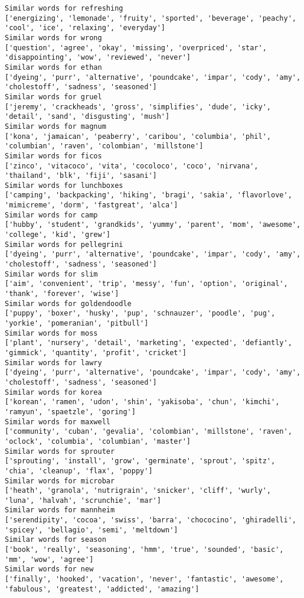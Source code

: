 \documentclass[11pt]{article}
\begin{document}
\begin{Verbatim}[commandchars=\\\{\}]
Similar words for refreshing
['energizing', 'lemonade', 'fruity', 'sported', 'beverage', 'peachy', 'cool', 'ice', 'relaxing', 'everyday']
Similar words for wrong
['question', 'agree', 'okay', 'missing', 'overpriced', 'star', 'disappointing', 'wow', 'reviewed', 'never']
Similar words for ethan
['dyeing', 'purr', 'alternative', 'poundcake', 'impar', 'cody', 'amy', 'cholestoff', 'sadness', 'seasoned']
Similar words for gruel
['jeremy', 'crackheads', 'gross', 'simplifies', 'dude', 'icky', 'detail', 'sand', 'disgusting', 'mush']
Similar words for magnum
['kona', 'jamaican', 'peaberry', 'caribou', 'columbia', 'phil', 'columbian', 'raven', 'colombian', 'millstone']
Similar words for ficos
['zinco', 'vitacoco', 'vita', 'cocoloco', 'coco', 'nirvana', 'thailand', 'blk', 'fiji', 'sasani']
Similar words for lunchboxes
['camping', 'backpacking', 'hiking', 'bragi', 'sakia', 'flavorlove', 'mimicreme', 'dorm', 'fastgreat', 'alca']
Similar words for camp
['hubby', 'student', 'grandkids', 'yummy', 'parent', 'mom', 'awesome', 'college', 'kid', 'grew']
Similar words for pellegrini
['dyeing', 'purr', 'alternative', 'poundcake', 'impar', 'cody', 'amy', 'cholestoff', 'sadness', 'seasoned']
Similar words for slim
['aim', 'convenient', 'trip', 'messy', 'fun', 'option', 'original', 'thank', 'forever', 'wise']
Similar words for goldendoodle
['puppy', 'boxer', 'husky', 'pup', 'schnauzer', 'poodle', 'pug', 'yorkie', 'pomeranian', 'pitbull']
Similar words for moss
['plant', 'nursery', 'detail', 'marketing', 'expected', 'defiantly', 'gimmick', 'quantity', 'profit', 'cricket']
Similar words for lawry
['dyeing', 'purr', 'alternative', 'poundcake', 'impar', 'cody', 'amy', 'cholestoff', 'sadness', 'seasoned']
Similar words for korea
['korean', 'ramen', 'udon', 'shin', 'yakisoba', 'chun', 'kimchi', 'ramyun', 'spaetzle', 'goring']
Similar words for maxwell
['community', 'cuban', 'gevalia', 'colombian', 'millstone', 'raven', 'oclock', 'columbia', 'columbian', 'master']
Similar words for sprouter
['sprouting', 'install', 'grow', 'germinate', 'sprout', 'spitz', 'chia', 'cleanup', 'flax', 'poppy']
Similar words for microbar
['heath', 'granola', 'nutrigrain', 'snicker', 'cliff', 'wurly', 'luna', 'halvah', 'scrunchie', 'mar']
Similar words for mannheim
['serendipity', 'cocoa', 'swiss', 'barra', 'chococino', 'ghiradelli', 'spicey', 'bellagio', 'semi', 'meltdown']
Similar words for season
['book', 'really', 'seasoning', 'hmm', 'true', 'sounded', 'basic', 'mm', 'wow', 'agree']
Similar words for new
['finally', 'hooked', 'vacation', 'never', 'fantastic', 'awesome', 'fabulous', 'greatest', 'addicted', 'amazing']

\end{Verbatim}
\end{document}
